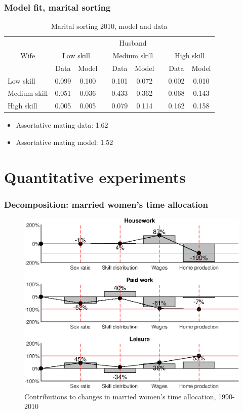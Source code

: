 \documentclass{beamer}
\begin{document}
\begin{frame}
	\frametitle{Model fit, marital sorting}\label{frame:fit_ms}
	\scriptsize
	\begin{table}[]
		\centering
		\caption{Marital sorting 2010, model and data}
		\begin{tabular}{lcccccccc}
			\toprule
			\multicolumn{1}{c}{\multirow{3}[6]{*}{Wife}} & \multicolumn{8}{c}{Husband} \\
			\cmidrule{2-9}          & \multicolumn{2}{c}{Low skill} &       & \multicolumn{2}{c}{Medium skill} &       & \multicolumn{2}{c}{High skill} \\
			\cmidrule{2-3}\cmidrule{5-6}\cmidrule{8-9}          & Data  & Model &       & Data  & Model &       & Data  & Model \\
			\midrule
			Low skill & 0.099 & 0.100 &       & 0.101 & 0.072 &       & 0.002 & 0.010 \\
			Medium skill & 0.051 & 0.036 &       & 0.433 & 0.362 &       & 0.068 & 0.143 \\
			High skill & 0.005 & 0.005 &       & 0.079 & 0.114 &       & 0.162 & 0.158 \\
			\bottomrule
			\bottomrule
		\end{tabular}
	\end{table}

	\begin{itemize}
	\item Assortative mating data: 1.62
	\item Assortative mating model: 1.52
	\end{itemize}

	\hyperlink{appendix:ct_approach}{}
\end{frame}

\section{Quantitative experiments}

\begin{frame}
	\frametitle{Decomposition: married women's time allocation}\label{slide:decomp_female_ta}
	\begin{figure}[hp]
		\centering
		\caption{Contributions to changes in married women's time allocation, 1990-2010}
		\includegraphics[width=.6\textwidth]{for_decomp_ta_f}
	\end{figure}
	\hyperlink{slide:decomp_female_ta_back}{}
\end{frame}
\end{document}
